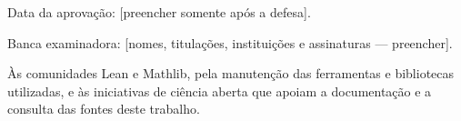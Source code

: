 \documentclass[12pt,openany,oneside,a4paper,brazil,chapter=TITLE]{abntex2}
\begin{document}
\begin{folhadeaprovacao}
\begin{center}\imprimirautor\par\vspace{\baselineskip}\textbf{\imprimirtitulo}\end{center}
\vspace{\baselineskip}
\noindent\hspace*{0.5\textwidth}\begin{minipage}{0.5\textwidth}\SingleSpacing\imprimirpreambulo\end{minipage}
\vspace{2\baselineskip}
\noindent Data da aprovação: [preencher somente após a defesa].\par
\noindent Banca examinadora: [nomes, titulações, instituições e assinaturas --- preencher].\par
\vspace{2\baselineskip}
\end{folhadeaprovacao}
\begin{agradecimentos}
Às comunidades Lean e Mathlib, pela manutenção das ferramentas e bibliotecas utilizadas, e às iniciativas de ciência aberta que apoiam a documentação e a consulta das fontes deste trabalho.
\end{agradecimentos}
\end{document}
